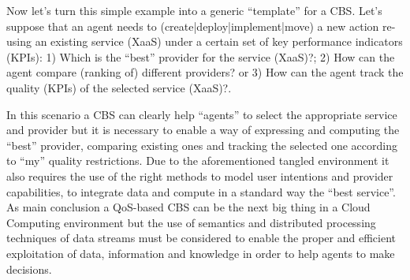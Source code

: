 Now let's turn this simple example into a generic ``template'' for a CBS. Let's suppose that an agent 
needs to (create|deploy|implement|move) a new action re-using an existing service (XaaS) 
under a certain set of key performance indicators (KPIs): 1) Which is the ``best'' provider for the service (XaaS)?; 2)
How can the agent compare (ranking of) different providers? or 
3) How can the agent track the quality (KPIs) of the selected service (XaaS)?.
  
In this scenario a CBS can clearly help ``agents'' to select the appropriate service and provider 
but it is necessary to enable a way of expressing and computing the ``best'' provider, comparing 
existing ones and tracking the selected one according to ``my'' quality restrictions. Due to 
the aforementioned tangled environment it also requires the use of the right methods to model user intentions and 
provider capabilities, to integrate data and compute in a standard way the ``best service''. As main conclusion a QoS-based CBS can be the next big thing in a Cloud Computing environment but the use of semantics and 
distributed processing techniques of data streams must be considered to enable the proper and efficient 
exploitation of data, information and knowledge in order to help agents to make decisions.








